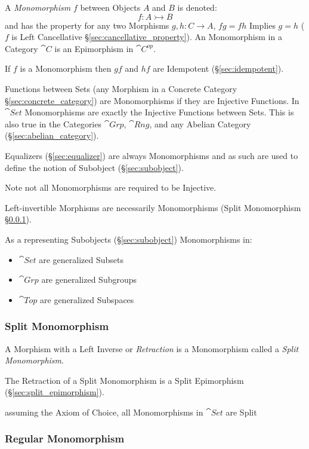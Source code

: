 A \emph{Monomorphism} $f$ between Objects $A$ and $B$ is denoted:
\[
  f : A \rightarrowtail B
\]
and has the property for any two Morphisms $g, h : C \rightarrow A$,
$fg = fh$ Implies $g = h$ ($f$ is Left Cancellative
\S\ref{sec:cancellative_property}). An Monomorphism in a Category
$\cat{C}$ is an Epimorphism in $\cat{C^{op}}$.

If $f$ is a Monomorphism then $gf$ and $hf$ are Idempotent
(\S\ref{sec:idempotent}). %

Functions between Sets (any Morphism in a Concrete Category
\S\ref{sec:concrete_category}) are Monomorphisms if they are Injective
Functions. In $\cat{Set}$ Monomorphisms are exactly the Injective
Functions between Sets. This is also true in the Categories
$\cat{Grp}$, $\cat{Rng}$, and any Abelian Category
(\S\ref{sec:abelian_category}).

Equalizers (\S\ref{sec:equalizer}) are always Monomorphisms and as
such are used to define the notion of Subobject
(\S\ref{sec:subobject}).

\fist Note not all Monomorphisms are required to be Injective.

Left-invertible Morphisms are necessarily Monomorphisms (Split
Monomorphism \S\ref{sec:split_monomorphism}).

As a representing Subobjects (\S\ref{sec:subobject}) Monomorphisms in:
\begin{itemize}
  \item $\cat{Set}$ are generalized Subsets
  \item $\cat{Grp}$ are generalized Subgroups
  \item $\cat{Top}$ are generalized Subspaces
\end{itemize}



\subsubsection{Split Monomorphism}\label{sec:split_monomorphism}

A Morphism with a Left Inverse or \emph{Retraction} is a Monomorphism
called a \emph{Split Monomorphism}.

The Retraction of a Split Monomorphism is a Split Epimorphism
(\S\ref{sec:split_epimorphism}).

assuming the Axiom of Choice, all Monomorphisms in $\cat{Set}$ are
Split



\subsubsection{Regular Monomorphism}\label{sec:regular_monomorphism}

